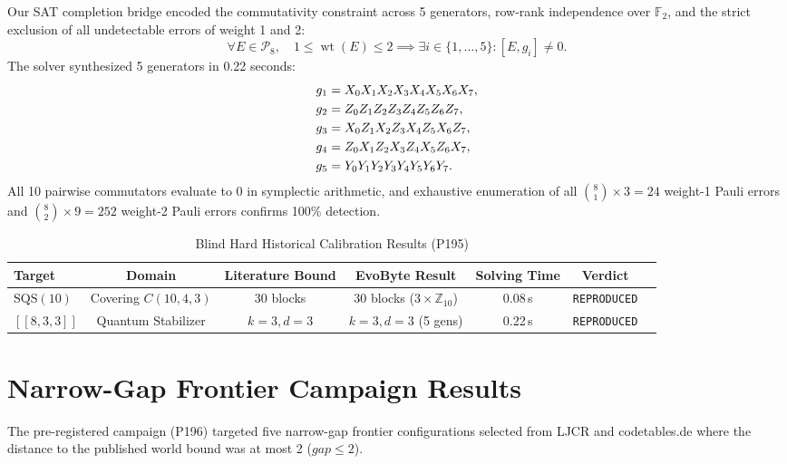 \documentclass[11pt,a4paper]{article}
\begin{document}
Our SAT completion bridge encoded the commutativity constraint across 5 generators, row-rank independence over $\mathbb{F}_2$, and the strict exclusion of all undetectable errors of weight 1 and 2:
\begin{equation}
\label{eq:error_cond}
\forall E \in \mathcal{P}_8, \quad 1 \le \operatorname{wt}(E) \le 2 \implies \exists i \in \{1, \dots, 5\} : [E, g_i] \ne 0.
\end{equation}
The solver synthesized 5 generators in 0.22 seconds:
\begin{align}
g_1 &= X_0 X_1 X_2 X_3 X_4 X_5 X_6 X_7, \notag \\
g_2 &= Z_0 Z_1 Z_2 Z_3 Z_4 Z_5 Z_6 Z_7, \notag \\
g_3 &= X_0 Z_1 X_2 Z_3 X_4 Z_5 X_6 Z_7, \label{eq:gottesman_gens} \\
g_4 &= Z_0 X_1 Z_2 X_3 Z_4 X_5 Z_6 X_7, \notag \\
g_5 &= Y_0 Y_1 Y_2 Y_3 Y_4 Y_5 Y_6 Y_7. \notag
\end{align}
All 10 pairwise commutators evaluate to 0 in symplectic arithmetic, and exhaustive enumeration of all $\binom{8}{1} \times 3 = 24$ weight-1 Pauli errors and $\binom{8}{2} \times 9 = 252$ weight-2 Pauli errors confirms 100\% detection.

\begin{table}[t]
\centering
\caption{Blind Hard Historical Calibration Results (P195)}
\label{tab:calibration}
\begin{tabular}{lcccccc}
\toprule
\textbf{Target} & \textbf{Domain} & \textbf{Literature Bound} & \textbf{EvoByte Result} & \textbf{Solving Time} & \textbf{Verdict} \\
\midrule
$\text{SQS}(10)$ & Covering $C(10, 4, 3)$ & 30 blocks \cite{mills1979sqs} & 30 blocks ($3 \times \mathbb{Z}_{10}$) & 0.08\,s & \texttt{REPRODUCED} \\
$[[8, 3, 3]]$ & Quantum Stabilizer & $k=3, d=3$ \cite{gottesman1996stabilizer} & $k=3, d=3$ (5 gens) & 0.22\,s & \texttt{REPRODUCED} \\
\bottomrule
\end{tabular}
\end{table}

\section{Narrow-Gap Frontier Campaign Results}
\label{sec:campaign}

The pre-registered campaign (P196) targeted five narrow-gap frontier configurations selected from LJCR and codetables.de where the distance to the published world bound was at most 2 ($gap \le 2$).
\end{document}
